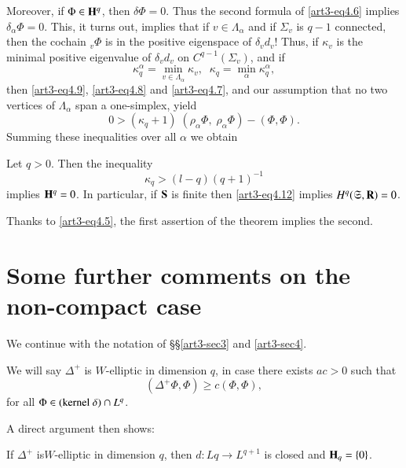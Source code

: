 \begin{remark*}
Moreover, if $\Phi \in \mathbf{H}^q$, then $\delta \Phi=0$. Thus the second formula of \eqref{art3-eq4.6} implies $\delta_\alpha \Phi = 0$. This, it turns out, implies that if $v \in \Lambda_\alpha$ and if $\Sigma_v$ is $q -1$ connected, then the cochain ${}_v\Phi$ is in the positive eigenspace of $\delta_v d_v$! Thus, if $\kappa_v$ is the minimal positive eigenvalue of $\delta_v d_v$ on $C^{q-1} (\Sigma_v)$, and if 
$$
\kappa^\alpha_q = \min\limits_{v \in \Lambda_\alpha} \kappa_v, \;\; \kappa_q = \min\limits_\alpha \kappa^\alpha_q,
$$
then \eqref{art3-eq4.9}, \eqref{art3-eq4.8} and \eqref{art3-eq4.7}, and our assumption that no two vertices of $\Lambda_\alpha$ span a one-simplex, yield
\begin{equation}
0 > (\kappa_q + 1) \; (\rho_\alpha \Phi, \; \rho_\alpha \Phi) - (\Phi, \Phi). \label{art3-eq4.10}
\end{equation}
Summing these inequalities over all $\alpha$ we obtain
\end{remark*}

\begin{theorem}\label{art3-thm4.11}
Let $q > 0$. Then the inequality
\begin{equation}
\kappa_q > (l-q) (q+1)^{-1} \label{art3-eq4.12}
\end{equation}
implies $\mathbf{H}^q =0$. In particular, if $\mathbf{S}$ is finite then \eqref{art3-eq4.12} implies $H^q (\mathfrak{S} , \mathbf{R}) = 0$.
\end{theorem}

\begin{remark*}
Thanks to \eqref{art3-eq4.5}, the first assertion of the theorem implies the second. 
\end{remark*}

\section{Some further comments on the non-compact case}\label{art3-sec5}
We continue with the notation of \S\S\ref{art3-sec3} and \ref{art3-sec4}.

\begin{defi*}
We will say $\Delta^+$ is $W$-elliptic in dimension $q$, in case there exists $a  c > 0$ such that 
$$
(\Delta^+ \Phi, \Phi) \geqslant c (\Phi, \Phi),
$$
for all $\Phi \in ({\rm kernel}~  \delta) \cap L^q$.
\end{defi*}

A direct argument then shows:

\begin{prop*}
If $\Delta^+$ is\pageoriginale $W$-elliptic in dimension $q$, then $d : Lq \to L^{q+1}$ is closed and $\mathbf{H}_q = \{0\}$.
\end{prop*}

